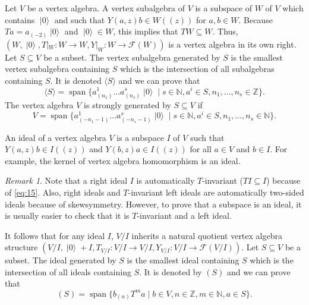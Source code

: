 \documentclass[a4paper, 12pt, reqno]{amsart}
\theoremstyle{remark}
\newtheorem{remark}[theorem]{Remark}
\numberwithin{equation}{subsection}
\DeclareMathOperator{\vspan}{span}
\DeclareMathOperator{\vac}{|0\rangle}
\begin{document}
Let $V$ be a vertex algebra.
A vertex subalgebra of $V$ is a subspace of $W$ of $V$ which contains $\vac$ and such that $Y(a, z)b \in W((z))$ for $a, b \in W$.
Because $Ta = a_{(-2)}\vac$ and $\vac \in W$, this implies that $TW \subseteq W$.
Thus, $(W, \vac, T|_{W}: W \to W, Y|_{W}: W \to \mathcal{F}(W))$ is a vertex algebra in its own right.
Let $S \subseteq V$ be a subset.
The vertex subalgebra generated by $S$ is the smallest vertex subalgebra containing $S$ which is the intersection of all subalgebras containing $S$.
It is denoted $\langle S \rangle$ and we can prove that
\begin{equation*}
  \langle S \rangle = \vspan \{a^1_{(n_1)}\dots a^s_{(n_s)}\vac \mid s \in \mathbb{N}, a^i \in S, n_1, \dots, n_s \in \mathbb{Z}\}.
\end{equation*}
The vertex algebra $V$ is strongly generated by $S \subseteq V$ if
\begin{equation*}
  V = \vspan \{a^1_{(-n_1 - 1)}\dots a^s_{(-n_s - 1)}\vac \mid s \in \mathbb{N}, a^i \in S, n_1, \dots, n_s \in \mathbb{N}\}.
\end{equation*}

An ideal of a vertex algebra $V$ is a subspace $I$ of $V$ such that $Y(a, z)b \in I((z))$ and $Y(b, z)a \in I((z))$ for all $a \in V$ and $b \in I$.
For example, the kernel of vertex algebra homomorphism is an ideal.

\begin{remark}
  \label{rmk:11}
  Note that a right ideal $I$ is automatically $T$-invariant ($TI \subseteq I$) because of \eqref{eq:15}.
  Also, right ideals and $T$-invariant left ideals are automatically two-sided ideals because of skewsymmetry.
  However, to prove that a subspace is an ideal, it is usually easier to check that it is $T$-invariant and a left ideal.
\end{remark}

It follows that for any ideal $I$, $V/I$ inherits a natural quotient vertex algebra structure $(V/I, \vac + I,T_{V/I}: V/I \to V/I, Y_{V/I}: V/I \to \mathcal{F}(V/I))$.
Let $S \subseteq V$ be a subset.
The ideal generated by $S$ is the smallest ideal containing $S$ which is the intersection of all ideals containing $S$.
It is denoted by $(S)$ and we can prove that
\begin{equation*}
  (S) = \vspan\{b_{(n)}T^ma \mid b \in V, n \in \mathbb{Z}, m \in \mathbb{N}, a \in S\}.
\end{equation*}
\end{document}
